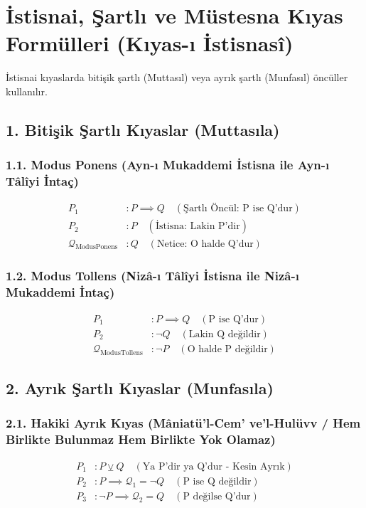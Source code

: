 \documentclass[11pt, a4paper]{article}
\begin{document}
\section{İstisnai, Şartlı ve Müstesna Kıyas Formülleri (Kıyas-ı İstisnasî)}

İstisnai kıyaslarda bitişik şartlı (Muttasıl) veya ayrık şartlı (Munfasıl) öncüller kullanılır.

\subsection{1. Bitişik Şartlı Kıyaslar (Muttasıla)}

\subsubsection{1.1. Modus Ponens (Ayn-ı Mukaddemi İstisna ile Ayn-ı Tâlîyi İntaç)}
\begin{align}
P_1 &: P \implies Q \quad (\text{Şartlı Öncül: P ise Q'dur}) \\
P_2 &: P \quad (\text{İstisna: Lakin P'dir}) \\
\mathcal{Q}_{\text{ModusPonens}} &: Q \quad (\text{Netice: O halde Q'dur})
\end{align}

\subsubsection{1.2. Modus Tollens (Nizâ-ı Tâlîyi İstisna ile Nizâ-ı Mukaddemi İntaç)}
\begin{align}
P_1 &: P \implies Q \quad (\text{P ise Q'dur}) \\
P_2 &: \neg Q \quad (\text{Lakin Q değildir}) \\
\mathcal{Q}_{\text{ModusTollens}} &: \neg P \quad (\text{O halde P değildir})
\end{align}

\subsection{2. Ayrık Şartlı Kıyaslar (Munfasıla)}

\subsubsection{2.1. Hakiki Ayrık Kıyas (Mâniatü'l-Cem' ve'l-Hulüvv / Hem Birlikte Bulunmaz Hem Birlikte Yok Olamaz)}
\begin{align}
P_1 &: P \veebar Q \quad (\text{Ya P'dir ya Q'dur - Kesin Ayrık}) \\
P_2 &: P \implies \mathcal{Q}_1 = \neg Q \quad (\text{P ise Q değildir}) \\
P_3 &: \neg P \implies \mathcal{Q}_2 = Q \quad (\text{P değilse Q'dur})
\end{align}
\end{document}
